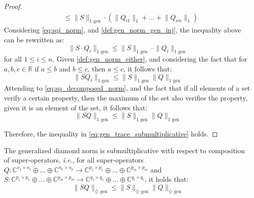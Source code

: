 \begin{proof}
\begin{equation}
\begin{split}
  &  \leq  \lVert S  \rVert_{1 \text{ gen}} \cdot (\lVert Q_{i1} \rVert_{1} + \ldots + \lVert Q_{im} \rVert_{1})
  \end{split}
\end{equation}
Considering \autoref{eq:sqi_norm}, and \autoref{def:gen_norm_gen_inj}, the inequality above can be rewritten as: 
\begin{equation}
   \lVert S \cdot  Q_i \rVert_{1 \text{ gen}} \leq \lVert S  \rVert_{1 \text{ gen}} \cdot \lVert Q_i  \rVert_{1 \text{ gen}}
\end{equation}
for all $1 \leq i \leq n$. Given \autoref{def:gen_norm_either}, and considering the fact that for $a,b,c \in \mathbb{R}$ if $a \leq b$ and $b \leq c$, then $a \leq c$, it follows that:
\begin{equation}
  \lVert S  Q_i \rVert_{1 \text{ gen}} \leq \lVert S \rVert_{1 \text{ gen}} \lVert Q \rVert_{1 \text{ gen}}
\end{equation}
Attending to \autoref{eq:sq_decomposed_norm}, and the fact that if all elements of a set verify a certain property, then the maximum of the set also verifies the property, given it is an element of the set, it follows that:
\begin{equation}
  \lVert S  Q \rVert_{1 \text{ gen}} \leq \lVert S \rVert_{1 \text{ gen}} \lVert Q \rVert_{1 \text{ gen}}
\end{equation}

Therefore, the inequality in \autoref{eq:gen_trace_submultiplicative} holds.



\end{proof}


\begin{lemma}\label{lem:gen_diamond_submultiplicative}
  The generalized diamond norm is submultiplicative with respect to composition of super‑operators, \textit{i.e.}, for all super-operators $Q: \mathbb{C}^{o_1 \times o_1} \oplus \ldots \oplus \mathbb{C}^{o_n \times o_n}  \rightarrow \mathbb{C}^{p_1 \times p_1} \oplus \ldots \oplus  \mathbb{C}^{p_m \times p_m}$ and $S: \mathbb{C}^{p_1 \times p_1} \oplus \ldots \oplus \mathbb{C}^{p_m \times p_m}  \rightarrow \mathbb{C}^{q_1 \times q_1} \oplus \ldots \oplus \mathbb{C}^{q_t \times q_t}$, it holds that:
  \begin{equation} \label{eq:gen_trace_submultiplicative}
    \lVert S  Q \rVert_{\diamondsuit \text{ gen}} \leq \lVert S \rVert_{\diamondsuit  \text{ gen}} \lVert Q \rVert_{\diamondsuit  \text{ gen}}
  \end{equation}
\end{lemma}


